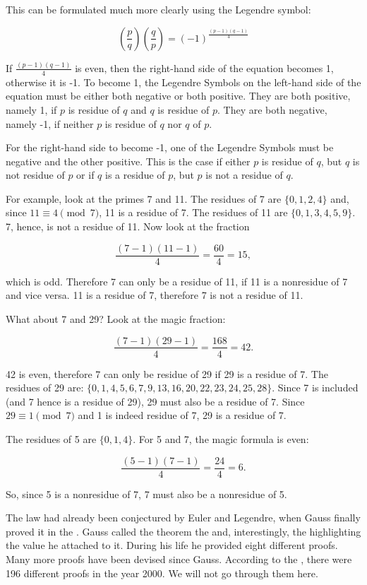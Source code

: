 \documentclass{scrreprt}
\begin{document}
This can be formulated much more clearly
using the Legendre symbol:

\begin{equation}
\left(\frac{p}{q}\right)
\left(\frac{q}{p}\right) = (-1)^{\frac{(p-1)(q-1)}{4}}
\end{equation}

If $\frac{(p-1)(q-1)}{4}$ is even,
then the right-hand side of the equation
becomes 1, otherwise it is -1.
To become 1, the Legendre Symbols
on the left-hand side of the equation must be 
either both negative or both positive.
They are both positive, namely 1,
if $p$ is residue of $q$ and $q$ is residue of $p$.
They are both negative, namely -1, if
neither $p$ is residue of $q$ nor $q$ of $p$.

For the right-hand side to become -1, 
one of the Legendre Symbols must be negative
and the other positive.
This is the case if either $p$ is residue of $q$,
but $q$ is not residue of $p$ or if $q$ is a residue
of $p$, but $p$ is not a residue of $q$.

For example, look at the primes 7 and 11.
The residues of 7 are $\lbrace 0,1,2,4\rbrace$ and,
since $11 \equiv 4 \pmod{7}$, 11 is a residue of 7.
The residues of 11 are $\lbrace 0,1,3,4,5,9\rbrace$.
7, hence, is not a residue of 11.
Now look at the fraction 

\[
\frac{(7-1)(11-1)}{4} =  \frac{60}{4} = 15,
\]

which is odd. Therefore 7 can only be a residue of 11,
if 11 is a nonresidue of 7 and vice versa.
11 is a residue of 7, therefore 7 is not a residue of 11.

What about 7 and 29? Look at the magic fraction:

\[
\frac{(7-1)(29-1)}{4} =  \frac{168}{4} = 42.
\]

42 is even, therefore 7 can only be residue of 29
if 29 is a residue of 7.
The residues of 29 are: 
$\lbrace 0,1,4,5,6,7,9,13,16,20,22,23,24,25,28\rbrace$.
Since 7 is included (and 7 hence is a residue of 29),
29 must also be a residue of 7.
Since $29 \equiv 1 \pmod{7}$ and 1 is indeed residue of 7,
29 is a residue of 7.

The residues of 5 are $\lbrace 0,1,4\rbrace$.
For 5 and 7, the magic formula is even:

\[
\frac{(5-1)(7-1)}{4} =  \frac{24}{4} = 6.
\]

So, since 5 is a nonresidue of 7, 7 must also be a nonresidue of 5.

The law had already been conjectured by Euler and Legendre,
when Gauss finally proved it in the .
Gauss called the theorem the 
and, interestingly, the 
highlighting the value he attached to it.
During his life he provided eight different proofs.
Many more proofs have been devised since Gauss.
According to the , 
there were 196 different proofs in the year \num{2000}.
We will not go through them here.
\end{document}

